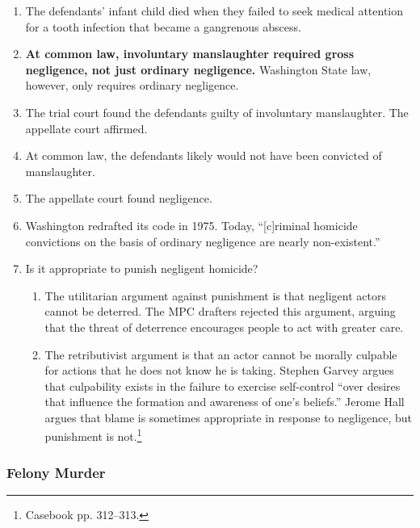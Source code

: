 \begin{enumerate}
    \item The defendants' infant child died when they failed to seek medical attention for a tooth infection that became a gangrenous abscess.
    \item \textbf{At common law, involuntary manslaughter required gross negligence, not just ordinary negligence.} Washington State law, however, only requires ordinary negligence.
    \item The trial court found the defendants guilty of involuntary manslaughter. The appellate court affirmed.
    \item At common law, the defendants likely would not have been convicted of manslaughter.
    \item The appellate court found negligence.
    \item Washington redrafted its code in 1975. Today, ``[c]riminal homicide convictions on the basis of ordinary negligence are nearly non-existent.''
    \item Is it appropriate to punish negligent homicide?
    \begin{enumerate}
        \item The utilitarian argument against punishment is that negligent actors cannot be deterred. The MPC drafters rejected this argument, arguing that the threat of deterrence encourages people to act with greater care.
        \item The retributivist argument is that an actor cannot be morally culpable for actions that he does not know he is taking. Stephen Garvey argues that culpability exists in the failure to exercise self-control ``over desires that influence the formation and awareness of one's beliefs.'' Jerome Hall argues that blame is sometimes appropriate in response to negligence, but punishment is not.\footnote{Casebook pp. 312--313.}
    \end{enumerate}
\end{enumerate}

\subsubsection{Felony Murder}

